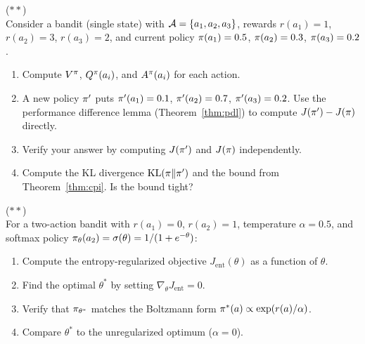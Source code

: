 \documentclass[11pt,a4paper]{article}
\begin{document}
\begin{exercise}
\textnormal{(\(**\))} \\
  Consider a bandit (single state) with $\mathcal{A} = \{a_1, a_2, a_3\}$,
  rewards $r(a_1) = 1$, $r(a_2) = 3$, $r(a_3) = 2$, and current
  policy $\pi(a_1) = 0.5$, $\pi(a_2) = 0.3$, $\pi(a_3) = 0.2$.
  \begin{enumerate}[label=(\alph*)]
    \item Compute $V^{\pi}$, $Q^{\pi}(a_i)$, and $A^\pi(a_i)$ for
      each action.
    \item A new policy $\pi'$ puts $\pi'(a_1) = 0.1$,
      $\pi'(a_2) = 0.7$, $\pi'(a_3) = 0.2$. Use the
      performance difference lemma (Theorem~\ref{thm:pdl}) to compute
      $J(\pi') - J(\pi)$ directly.
    \item Verify your answer by computing $J(\pi')$ and $J(\pi)$
      independently.
    \item Compute the KL divergence $\operatorname{KL}(\pi \| \pi')$ and the
      bound from Theorem~\ref{thm:cpi}. Is the bound tight?
  \end{enumerate}
\end{exercise}

\begin{exercise}
\textnormal{(\(**\))} \\
  For a two-action bandit with $r(a_1) = 0$, $r(a_2) = 1$, temperature
  $\alpha = 0.5$, and softmax policy
  $\pi_\theta(a_2) = \sigma(\theta) = 1/(1 + e^{-\theta})$:
  \begin{enumerate}[label=(\alph*)]
    \item Compute the entropy-regularized objective
      $J_{\mathrm{ent}}(\theta)$ as a function of $\theta$.
    \item Find the optimal $\theta^*$ by setting
      $\nabla_\theta J_{\mathrm{ent}} = 0$.
    \item Verify that $\pi_{\theta^*}$ matches the Boltzmann form
      $\pi^*(a) \propto \exp(r(a)/\alpha)$.
    \item Compare $\theta^*$ to the unregularized optimum ($\alpha = 0$).
  \end{enumerate}
\end{exercise}
\end{document}
